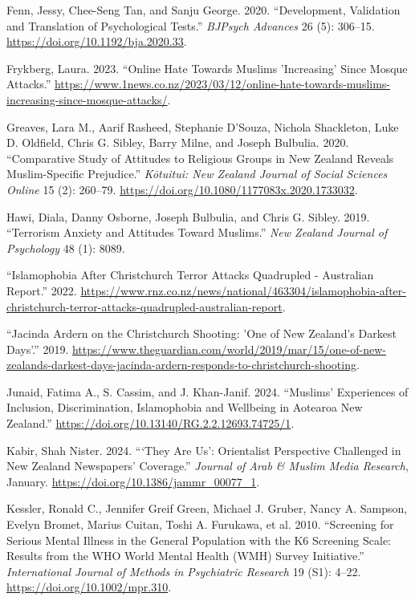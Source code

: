 \documentclass[
]{interact}
\newlength{\cslhangindent}
\newenvironment{CSLReferences}[2] %
 {\begin{list}{}{%
  \setlength{\itemindent}{0pt}
  \setlength{\leftmargin}{0pt}
  \setlength{\parsep}{0pt}
  \ifodd #1
   \setlength{\leftmargin}{\cslhangindent}
   \setlength{\itemindent}{-1\cslhangindent}
  \fi
  \setlength{\itemsep}{#2\baselineskip}}}
 {\end{list}}
\begin{document}
\begin{CSLReferences}{1}{0}
Fenn, Jessy, Chee-Seng Tan, and Sanju George. 2020. {``Development,
Validation and Translation of Psychological Tests.''} \emph{BJPsych
Advances} 26 (5): 306--15. \url{https://doi.org/10.1192/bja.2020.33}.

Frykberg, Laura. 2023. {``Online Hate Towards Muslims 'Increasing' Since
Mosque Attacks.''}
\url{https://www.1news.co.nz/2023/03/12/online-hate-towards-muslims-increasing-since-mosque-attacks/}.

Greaves, Lara M., Aarif Rasheed, Stephanie D'Souza, Nichola Shackleton,
Luke D. Oldfield, Chris G. Sibley, Barry Milne, and Joseph Bulbulia.
2020. {``Comparative Study of Attitudes to Religious Groups in New
Zealand Reveals Muslim-Specific Prejudice.''} \emph{K{ō}tuitui: New
Zealand Journal of Social Sciences Online} 15 (2): 260--79.
\url{https://doi.org/10.1080/1177083x.2020.1733032}.

Hawi, Diala, Danny Osborne, Joseph Bulbulia, and Chris G. Sibley. 2019.
{``Terrorism Anxiety and Attitudes Toward Muslims.''} \emph{New Zealand
Journal of Psychology} 48 (1): 8089.

{``Islamophobia After {C}hristchurch Terror Attacks Quadrupled -
{A}ustralian Report.''} 2022.
\url{https://www.rnz.co.nz/news/national/463304/islamophobia-after-christchurch-terror-attacks-quadrupled-australian-report}.

{``Jacinda {A}rdern on the {C}hristchurch Shooting: 'One of {N}ew
{Z}ealand's Darkest Days'.''} 2019.
\url{https://www.theguardian.com/world/2019/mar/15/one-of-new-zealands-darkest-days-jacinda-ardern-responds-to-christchurch-shooting}.

Junaid, Fatima A., S. Cassim, and J. Khan-Janif. 2024. {``Muslims'
Experiences of Inclusion, Discrimination, {I}slamophobia and Wellbeing
in {A}otearoa {N}ew {Z}ealand.''}
\url{https://doi.org/10.13140/RG.2.2.12693.74725/1}.

Kabir, Shah Nister. 2024. {``{`}They Are Us{'}: Orientalist Perspective
Challenged in New Zealand Newspapers{'} Coverage.''} \emph{Journal of
Arab \& Muslim Media Research}, January.
\url{https://doi.org/10.1386/jammr_00077_1}.

Kessler, Ronald C., Jennifer Greif Green, Michael J. Gruber, Nancy A.
Sampson, Evelyn Bromet, Marius Cuitan, Toshi A. Furukawa, et al. 2010.
{``Screening for Serious Mental Illness in the General Population with
the K6 Screening Scale: Results from the WHO World Mental Health (WMH)
Survey Initiative.''} \emph{International Journal of Methods in
Psychiatric Research} 19 (S1): 4--22.
\url{https://doi.org/10.1002/mpr.310}.


\end{CSLReferences}
\end{document}
